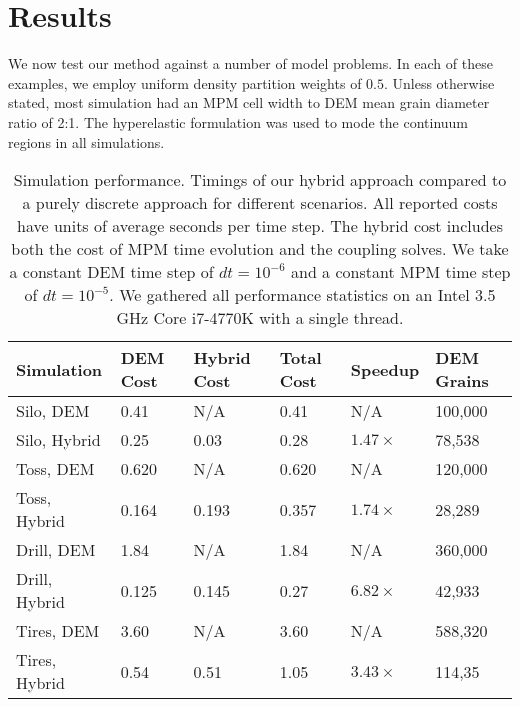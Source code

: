 \chapter{Results} \label{sec:results}
We now test our method against a number of model problems. In each of these examples, we employ uniform density
partition weights of $0.5$. Unless otherwise stated, most simulation had an MPM cell width to DEM mean grain diameter ratio of 2:1. The hyperelastic formulation was used to mode the continuum regions in all simulations. 


\begin{table}
  \begin{tabular}{llllll}
      \hline
      \textbf{Simulation} & \textbf{DEM Cost} & \textbf{Hybrid Cost} & \textbf{Total Cost} & \textbf{Speedup} & \textbf{DEM Grains}\\
      \hline
      Silo, DEM    & 0.41 & N/A & 0.41 & N/A  & 100,000\\
      Silo, Hybrid & 0.25 & 0.03 & 0.28 & $1.47\times$ & 78,538\\
      \hline
      Toss, DEM    & 0.620 & N/A & 0.620 & N/A  & 120,000\\
      Toss, Hybrid & 0.164 & 0.193 & 0.357 & $1.74\times$ & 28,289\\
      \hline
      Drill, DEM    & 1.84  & N/A  & 1.84  & N/A & 360,000\\
      Drill, Hybrid & 0.125 & 0.145 & 0.27 & $6.82\times$ & 42,933\\
      \hline
      Tires, DEM    & 3.60 & N/A & 3.60 & N/A  & 588,320\\
      Tires, Hybrid & 0.54 & 0.51 & 1.05 & $3.43\times$ & 114,35\\
      \hline
  \end{tabular}
  \vspace{0.2cm}
  \caption{Simulation performance. Timings of our hybrid approach compared to a purely discrete approach for different scenarios. All reported costs have units of average seconds per time step. The hybrid cost includes both the cost of MPM time evolution and the coupling solves. We take a constant DEM time step of $dt=10^{-6}$ and a constant MPM time step of $dt=10^{-5}$. We gathered all performance statistics on an Intel 3.5 GHz Core i7-4770K with a single thread.} \label{tbl:speedup}
\end{table}

